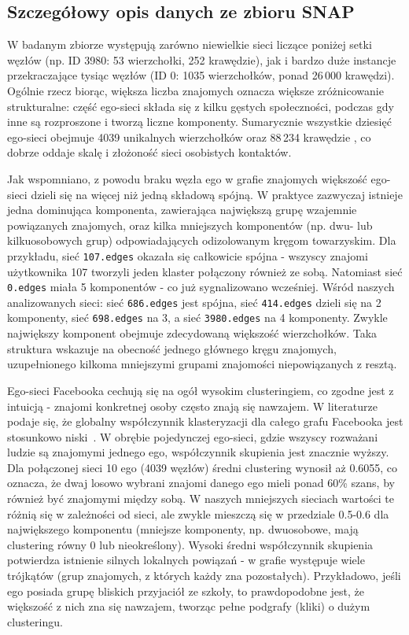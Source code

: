 \subsection{Szczegółowy opis danych ze zbioru SNAP}
W badanym zbiorze występują zarówno niewielkie sieci liczące poniżej setki węzłów (np. ID 3980: 53 wierzchołki, 252 krawędzie), jak i bardzo duże instancje przekraczające tysiąc węzłów (ID 0: 1035 wierzchołków, ponad 26\,000 krawędzi). Ogólnie rzecz biorąc, większa liczba znajomych oznacza większe zróżnicowanie strukturalne: część ego-sieci składa się z kilku gęstych społeczności, podczas gdy inne są rozproszone i tworzą liczne komponenty. Sumarycznie wszystkie dziesięć ego-sieci obejmuje 4039 unikalnych wierzchołków oraz 88\,234 krawędzie \cite{McAuley2012}, co dobrze oddaje skalę i złożoność sieci osobistych kontaktów.

Jak wspomniano, z powodu braku węzła ego w grafie znajomych większość ego-sieci dzieli się na więcej niż jedną składową spójną. W praktyce zazwyczaj istnieje jedna dominująca komponenta, zawierająca największą grupę wzajemnie powiązanych znajomych, oraz kilka mniejszych komponentów (np. dwu- lub kilkuosobowych grup) odpowiadających odizolowanym kręgom towarzyskim. Dla przykładu, sieć \verb|107.edges| okazała się całkowicie spójna - wszyscy znajomi użytkownika 107 tworzyli jeden klaster połączony również ze sobą. Natomiast sieć \verb|0.edges| miała 5 komponentów - co już sygnalizowano wcześniej. Wśród naszych analizowanych sieci: sieć \verb|686.edges| jest spójna, sieć \verb|414.edges| dzieli się na 2 komponenty, sieć \verb|698.edges| na 3, a sieć \verb|3980.edges| na 4 komponenty. Zwykle największy komponent obejmuje zdecydowaną większość wierzchołków. Taka struktura wskazuje na obecność jednego głównego kręgu znajomych, uzupełnionego kilkoma mniejszymi grupami znajomości niepowiązanych z resztą.

Ego-sieci Facebooka cechują się na ogół wysokim clusteringiem, co zgodne jest z intuicją - znajomi konkretnej osoby często znają się nawzajem. W literaturze podaje się, że globalny współczynnik klasteryzacji dla całego grafu Facebooka jest stosunkowo niski~\cite{Ugander2011}. W obrębie pojedynczej ego-sieci, gdzie wszyscy rozważani ludzie są znajomymi jednego ego, współczynnik skupienia jest znacznie wyższy. Dla połączonej sieci 10 ego (4039 węzłów) średni clustering wynosił aż 0.6055, co oznacza, że dwaj losowo wybrani znajomi danego ego mieli ponad 60\% szans, by również być znajomymi między sobą. W naszych mniejszych sieciach wartości te różnią się w zależności od sieci, ale zwykle mieszczą się w przedziale 0.5-0.6 dla największego komponentu (mniejsze komponenty, np. dwuosobowe, mają clustering równy 0 lub nieokreślony). Wysoki średni współczynnik skupienia potwierdza istnienie silnych lokalnych powiązań - w grafie występuje wiele trójkątów (grup znajomych, z których każdy zna pozostałych). Przykładowo, jeśli ego posiada grupę bliskich przyjaciół ze szkoły, to prawdopodobne jest, że większość z nich zna się nawzajem, tworząc pełne podgrafy (kliki) o dużym clusteringu.

